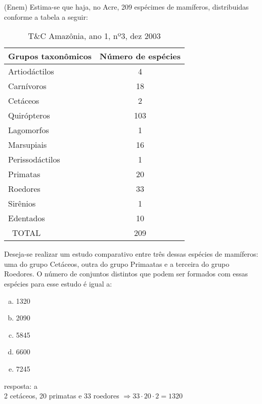 \begin{ex}
 (Enem) Estima-se que haja,  no Acre, 209 espécimes de mamíferos, distribuidas conforme a tabela a seguir:

\begin{table}
\centering
\begin{tabular}{|l|c|} \hline
\textbf{ Grupos taxonômicos } & \textbf{Número de espécies} \\  \hline   
Artiodáctilos & 4 \\  \hline
Carnívoros & 18    \\  \hline
Cetáceos & 2   \\  \hline
Quirópteros & 103  \\ \hline
Lagomorfos & 1 \\  \hline
Marsupiais  & 16 \\  \hline
Perissodáctilos & 1 \\  \hline
Primatas & 20 \\  \hline
Roedores & 33 \\  \hline
Sirênios & 1 \\  \hline
Edentados  & 10 \\ \hline
\ TOTAL & 209 \\ \hline
\end{tabular}
\caption*{T\&C Amazônia, ano 1, nº3, dez 2003}
\end{table}

Deseja-se realizar um estudo comparativo entre três dessas espécies de mamíferos: uma do grupo Cetáceos, outra do grupo Primaatas e a terceira do grupo Roedores. O número de conjuntos distintos que podem ser formados com essas espécies para esse estudo é igual a:
    \begin{enumerate}[(a)]
    \item 1320
    \item 2090
    \item 5845
    \item 6600
    \item 7245
    \end{enumerate}
      \begin{sol}
      resposta: a  \\
      2 cetáceos, 20 primatas e 33 roedores  
      $\Longrightarrow33\cdot20\cdot2=1320$
      
      \end{sol}
\end{ex}